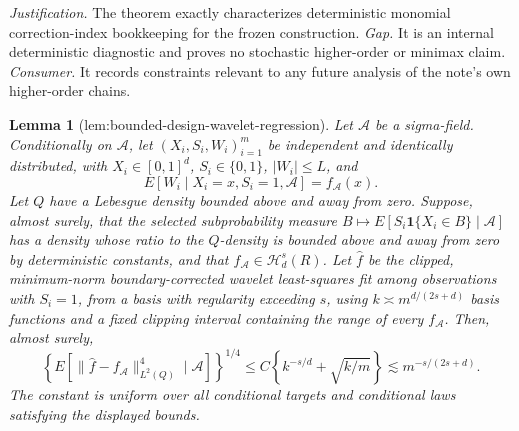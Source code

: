 \documentclass{article}
\newtheorem{lemma}{Lemma}
\begin{document}
\par\smallskip\noindent \textit{Justification.} The theorem exactly characterizes deterministic monomial correction-index bookkeeping for the frozen construction. \textit{Gap.} It is an internal deterministic diagnostic and proves no stochastic higher-order or minimax claim. \textit{Consumer.} It records constraints relevant to any future analysis of the note's own higher-order chains.

\begin{lemma}[lem:bounded-design-wavelet-regression]\label{lem:bounded-design-wavelet-regression}
Let \(\mathcal A\) be a sigma-field.  Conditionally on \(\mathcal A\), let \((X_i,S_i,W_i)_{i=1}^m\) be independent and identically distributed, with \(X_i\in[0,1]^d\), \(S_i\in\{0,1\}\), \(|W_i|\le L\), and
\[
E[W_i\mid X_i=x,S_i=1,\mathcal A]=f_{\mathcal A}(x).
\]
Let \(Q\) have a Lebesgue density bounded above and away from zero.  Suppose, almost surely, that the selected subprobability measure \(B\mapsto E[S_i\mathbf1\{X_i\in B\}\mid\mathcal A]\) has a density whose ratio to the \(Q\)-density is bounded above and away from zero by deterministic constants, and that \(f_{\mathcal A}\in\mathcal H_d^s(R)\).  Let \(\widehat f\) be the clipped, minimum-norm boundary-corrected wavelet least-squares fit among observations with \(S_i=1\), from a basis with regularity exceeding \(s\), using \(k\asymp m^{d/(2s+d)}\) basis functions and a fixed clipping interval containing the range of every \(f_{\mathcal A}\).  Then, almost surely,
\[
\left\{E\!\left[\|\widehat f-f_{\mathcal A}\|_{L^2(Q)}^4\mid\mathcal A\right]\right\}^{1/4}
\le C\left\{k^{-s/d}+\sqrt{k/m}\right\}\lesssim m^{-s/(2s+d)}.
\]
The constant is uniform over all conditional targets and conditional laws satisfying the displayed bounds.
\end{lemma}
\end{document}
